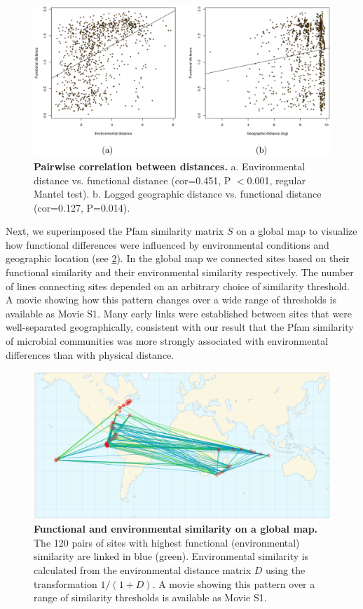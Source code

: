 \begin{figure}
\centering
\includegraphics[width=\textwidth]{NMF/figures/fig4}
\caption{\textbf{Pairwise correlation between distances. } a. Environmental distance vs. functional distance (cor=0.451, P $<$0.001, regular Mantel test).  b. Logged geographic distance vs. functional distance (cor=0.127, P=0.014).}
\label{scatter5}
\end{figure}

Next, we superimposed the Pfam similarity matrix $S$ on a global map to visualize how functional differences were influenced by environmental conditions and geographic location (see \ref{global}).  In the global map we connected sites based on their functional similarity and their environmental similarity respectively.  The number of lines connecting sites depended on an arbitrary choice of similarity threshold.  A movie showing how this pattern changes over a wide range of thresholds is available as Movie S1.  Many early links were established between sites that were well-separated geographically, consistent with our result that the Pfam similarity of microbial communities was more strongly associated with environmental differences than with physical distance.  

\begin{figure}
\label{global}
\centering
\includegraphics[width=\textwidth]{NMF/figures/fig5}
\caption[]{\textbf{Functional and environmental similarity on a global map. } The 120 pairs of sites with highest functional (environmental) similarity are linked in blue (green).  Environmental similarity is calculated from the environmental distance matrix $D$ using the transformation $1/(1+D)$. A movie showing this pattern over a range of similarity thresholds is available as Movie S1.}
\end{figure}

